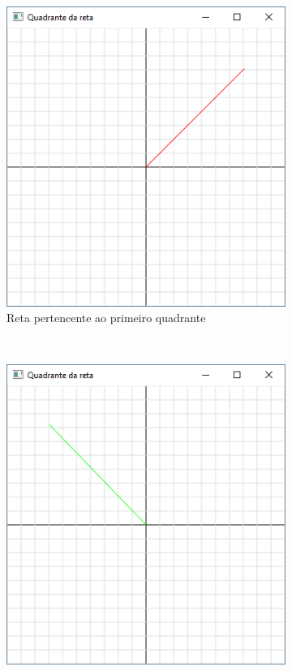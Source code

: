 \begin{enumerate}
  \begin{figure}[h!]
    \centering
    \begin{subfigure}{0.2\textwidth}
        \centerline{\includegraphics[width=.9\textwidth]{img/cap1_ex4}}
        \caption{Reta pertencente ao primeiro quadrante}
        \label{fig:cap01_ex4a}
    \end{subfigure}
    ~
    \begin{subfigure}{0.2\textwidth}
        \centerline{\includegraphics[width=.9\textwidth]{img/cap1_ex4b}}

\end{subfigure}
\end{figure}
\end{enumerate}
